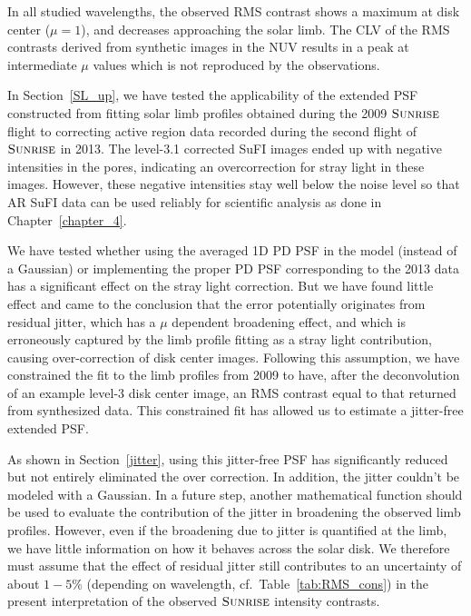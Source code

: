 \documentclass[goettingen, gauss, print]{thesis}
\begin{document}
In all studied wavelengths, the observed RMS contrast shows a maximum at disk center ($\mu=1$), and decreases approaching the solar limb. The CLV of the RMS contrasts derived from synthetic images in the NUV results in a peak at intermediate $\mu$ values which is not reproduced by the observations.

In Section~\ref{SL_up}, we have tested the applicability of the extended PSF constructed from fitting solar limb profiles obtained during the 2009 $\textsc{Sunrise}$ flight to correcting active region data recorded during the second flight of $\textsc{Sunrise}$ in 2013. The level-3.1 corrected SuFI images ended up with negative intensities in the pores, indicating an overcorrection for stray light in these images. However, these negative intensities stay well below the noise level so that AR SuFI data can be used reliably for scientific analysis as done in Chapter~\ref{chapter_4}.

We have tested whether using the averaged 1D PD PSF in the model (instead of a Gaussian) or implementing the proper PD PSF corresponding to the 2013 data has a significant effect on the stray light correction. But we have found little effect and came to the conclusion that the error potentially originates from residual jitter, which has a $\mu$ dependent broadening effect, and which is erroneously captured by the limb profile fitting as a stray light contribution, causing over-correction of disk center images. Following this assumption, we have constrained the fit to the limb profiles from 2009 to have, after the deconvolution of an example level-3 disk center image, an RMS contrast equal to that returned from synthesized data. This constrained fit has allowed us to estimate a jitter-free extended PSF.

As shown in Section~\ref{jitter}, using this jitter-free PSF has significantly reduced but not entirely eliminated the over correction. In addition, the jitter couldn't be modeled with a Gaussian. In a future step, another mathematical function should be used to evaluate the contribution of the jitter in broadening the observed limb profiles. However, even if the broadening due to jitter is quantified at the limb, we have little information on how it behaves across the solar disk. We therefore must assume that the effect of residual jitter still contributes to an uncertainty of about $1-5$\% (depending on wavelength, cf.~Table~\ref{tab:RMS_cons}) in the present interpretation of the observed $\textsc{Sunrise}$ intensity contrasts. 
\end{document}
